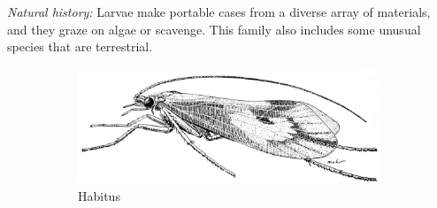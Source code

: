 \documentclass[letterpaper, 11pt]{article}
\begin{document}
\noindent{}\textit{Natural history:} Larvae make portable cases from a diverse array of materials, and they graze on algae or scavenge. This family also includes some unusual species that are terrestrial.\\

\begin{figure}[ht!]
    \centering
    \begin{subfigure}[ht!]{0.68\textwidth}
        \includegraphics[width=\textwidth]{LimnephilidaeHabitus.png}
        \caption{Habitus \citep[Modified from Fig. 641 in][]{bhl50956}}
        \label{fig:limnephilid1}
    \end{subfigure}
    \hfill %
    \begin{subfigure}[ht!]{0.15\textwidth}

\end{subfigure}
\end{figure}
\end{document}
